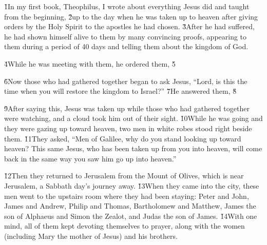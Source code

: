 


\v{1}In my first book, Theophilus, I wrote about everything Jesus did and taught from the beginning, \v{2}up to the day when he was taken up to heaven after giving orders by the Holy Spirit to the apostles he had chosen. \v{3}After he had suffered, he had shown himself alive to them by many convincing proofs, appearing to them during a period of 40 days and telling them about the kingdom of God.

\v{4}While he was meeting with them, he ordered them,  \v{5}

\v{6}Now those who had gathered together began to ask Jesus, ``Lord, is this the time when you will restore the kingdom to Israel?'' \v{7}He answered them,  \v{8}

\v{9}After saying this, Jesus was taken up while those who had gathered together were watching, and a cloud took him out of their sight. \v{10}While he was going and they were gazing up toward heaven, two men in white robes stood right beside them. \v{11}They asked, ``Men of Galilee, why do you stand looking up toward heaven? This same Jesus, who has been taken up from you into heaven, will come back in the same way you saw him go up into heaven.''

\v{12}Then they returned to Jerusalem from the Mount of Olives, which is near Jerusalem, a Sabbath day's journey away. \v{13}When they came into the city, these men went to the upstairs room where they had been staying: Peter and John, James and Andrew, Philip and Thomas, Bartholomew and Matthew, James the son of Alphaeus and Simon the Zealot, and Judas the son of James. \v{14}With one mind, all of them kept devoting themselves to prayer, along with the women (including Mary the mother of Jesus) and his brothers.


